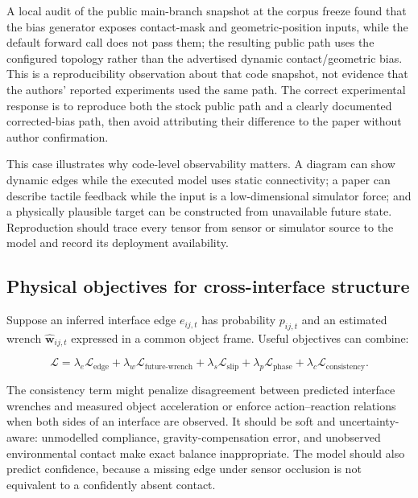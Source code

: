 A local audit of the public main-branch snapshot at the corpus freeze found that
the bias generator exposes contact-mask and geometric-position inputs, while the
default forward call does not pass them; the resulting public path uses the
configured topology rather than the advertised dynamic contact/geometric bias.
This is a reproducibility observation about that code snapshot, not evidence that
the authors' reported experiments used the same path. The correct experimental
response is to reproduce both the stock public path and a clearly documented
corrected-bias path, then avoid attributing their difference to the paper without
author confirmation.

This case illustrates why code-level observability matters. A diagram can show
dynamic edges while the executed model uses static connectivity; a paper can
describe tactile feedback while the input is a low-dimensional simulator force;
and a physically plausible target can be constructed from unavailable future
state. Reproduction should trace every tensor from sensor or simulator source to
the model and record its deployment availability.

\subsection{Physical objectives for cross-interface structure}

Suppose an inferred interface edge $e_{ij,t}$ has probability $p_{ij,t}$ and an
estimated wrench $\hat{\bm w}_{ij,t}$ expressed in a common object frame. Useful
objectives can combine:

\begin{equation}
\mathcal{L} = \lambda_e \mathcal{L}_{\text{edge}}
 + \lambda_w \mathcal{L}_{\text{future-wrench}}
 + \lambda_s \mathcal{L}_{\text{slip}}
 + \lambda_p \mathcal{L}_{\text{phase}}
 + \lambda_c \mathcal{L}_{\text{consistency}}.
\label{eq:physical_loss}
\end{equation}

The consistency term might penalize disagreement between predicted interface
wrenches and measured object acceleration or enforce action--reaction relations
when both sides of an interface are observed. It should be soft and
uncertainty-aware: unmodelled compliance, gravity-compensation error, and
unobserved environmental contact make exact balance inappropriate. The model
should also predict confidence, because a missing edge under sensor occlusion is
not equivalent to a confidently absent contact.

